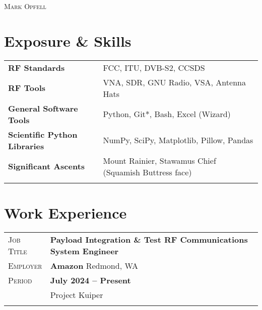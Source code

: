 \documentclass[a4paper, oneside, final]{scrartcl}
\newcommand{\gray}{\rowcolor[gray]{.90}} %
\begin{document}
\begin{center} %

\pdfpageheight 11in 
\pdfpagewidth 8.5in


{\fontsize{36}{36}\selectfont\scshape Mark Opfell} 
\vspace{1.16 cm} %


\section{Exposure \& Skills}
\begin{tabular}{ @{} >{\bfseries}l @{\hspace{6ex}} l }
RF Standards & FCC, ITU, DVB-S2, CCSDS \\
RF Tools & VNA, SDR, GNU Radio, VSA, Antenna Hats\\
General Software Tools & Python, Git*, Bash, Excel (Wizard)\\
Scientific Python Libraries & NumPy, SciPy, Matplotlib, Pillow, Pandas\\
Significant Ascents & Mount Rainier, Stawamus Chief (Squamish Buttress face)\\%
\\
\end{tabular}

\section{Work Experience}

\begin{tabularx}{0.97\linewidth}{>{\raggedleft\scshape}p{2cm}X}
\gray Job Title & \textbf{Payload Integration \& Test RF Communications System Engineer}\\
\gray Employer & \textbf{Amazon} \hfill Redmond, WA\\
\gray Period & \textbf{July 2024 -- Present}\\
&
\vspace{-0.15 cm}
Project Kuiper
\\
\\
\end{tabularx}


\end{center}
\end{document}
